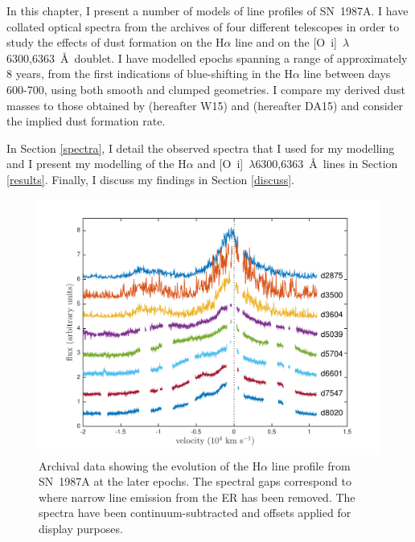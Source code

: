 In this chapter, I present a number of models of line profiles of SN~1987A. I have collated optical spectra from the archives of four different telescopes in order to study the effects of dust formation on 
the H$\alpha$ line and on the [O~{\sc i}]~$\lambda$6300,6363~\AA\ doublet.  
I have modelled epochs spanning a range of approximately 8 years, from the first 
indications of blue-shifting in the H$\alpha$ line between days 600-700, using 
both smooth and clumped geometries.  I compare my derived dust masses to 
those obtained by \citet{Wesson2015} (hereafter W15) and \citet{Dwek2015} (hereafter DA15) and consider the implied dust formation rate. 

In Section \ref{spectra}, I detail the observed spectra that I used for 
my modelling and I present my modelling of the 
H$\alpha$ and [O~{\sc i}]~$\lambda$6300,6363~\AA\ lines in 
Section \ref{results}.  Finally, I discuss my findings in Section 
\ref{discuss}.
    


\begin{figure}
\centering
\includegraphics[trim =45 10 45 15,clip=true,scale=0.7]{chapters/chapter5/images/Ha_evol_late_1col.pdf}
\caption{Archival data showing the evolution of the H$\alpha$
line profile from SN~1987A at the later epochs. The spectral gaps 
correspond to where narrow line emission from the ER has been 
removed. The spectra have been continuum-subtracted and offsets applied 
for display purposes.}
\label{Ha_evol_late}
\end{figure}


